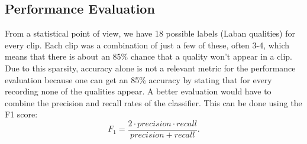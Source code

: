 \documentclass[11pt,twocolumn,varwidth=true,a4paper,fleqn]{article}
\begin{document}
\subsection{Performance Evaluation}
From a statistical point of view, we have 18 possible labels (Laban qualities) for every clip. 
Each clip was a combination of just a few of these, often 3-4, which means that there is about an 85\% chance that a quality won't appear in a clip. Due to
this sparsity, accuracy alone is not a relevant metric for the
performance evaluation because one can get an 85\% accuracy by stating that
for every recording none of the qualities appear. A better evaluation would have to
combine the precision and recall rates of the classifier. This can be done using 
the F1 score:
\begin{equation*}
F_{1} = \frac{2\cdot precision\cdot recall}{precision+recall}.
\end{equation*} 
\end{document}
